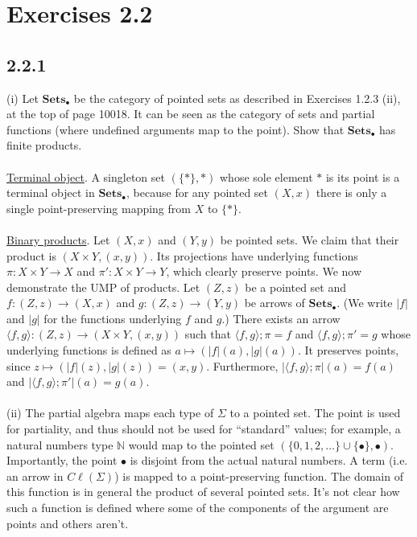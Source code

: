 \documentclass{article}
\newcommand{\mbf}{\mathbf}
\begin{document}
\section*{Exercises 2.2}

\subsection*{2.2.1}

(i) Let $\mbf{Sets}_{\bullet}$ be the category of pointed sets as described in Exercises 1.2.3 (ii), 
at the top of page 10018. 
It can be seen as the category of sets and partial functions (where undefined arguments map to the point). 
Show that $\mbf{Sets}_{\bullet}$ has finite products.\\~\\
\underline{Terminal object}. A singleton set $(\{ \ast \},\ast)$ whose sole element $\ast$ is its point
is a terminal object in $\mbf{Sets}_{\bullet}$, because for any pointed set $(X,x)$ there is only
a single point-preserving mapping from $X$ to $\{ \ast \}$.\\~\\
\underline{Binary products}. Let $(X,x)$ and $(Y,y)$ be pointed sets. We claim that their product
is $(X \times Y, (x,y))$. Its projections have underlying functions $\pi : X \times Y \to X$ 
and $\pi' : X \times Y \to Y$, which clearly preserve points. We now demonstrate the UMP of products.
Let $(Z,z)$ be a pointed set and $f : (Z,z) \to (X,x)$ and $g : (Z,z) \to (Y,y)$ be arrows of $\mbf{Sets}_{\bullet}$.
(We write $|f|$ and $|g|$ for the functions underlying $f$ and $g$.) There exists an arrow 
$\langle f, g \rangle : (Z,z) \to (X \times Y, (x,y))$ such that $\langle f, g \rangle;\pi = f$ and 
$\langle f,g \rangle;\pi' = g$ whose underlying functions is defined as $a \mapsto (|f|(a), |g|(a))$.
It preserves points, since $z \mapsto (|f|(z), |g|(z)) = (x,y)$. Furthermore, $|\langle f, g \rangle;\pi|(a) = 
f(a)$ and $|\langle f,g \rangle;\pi'|(a) = g(a)$.\\~\\
(ii) The partial algebra maps each type of $\Sigma$ to a pointed set. The point is used for partiality, 
and thus should not be used for ``standard'' values; for example, a natural numbers type $\mathbb N$
would map to the pointed set $(\{ 0,1,2,\ldots \} \cup \{ \bullet \}, \bullet)$. Importantly, 
the point $\bullet$ is disjoint from the actual natural numbers. A term (i.e. an arrow in $C \ell(\Sigma)$)
is mapped to a point-preserving function. The domain of this function is in general
the product of several pointed sets. It's not clear how such a function is defined where some of the components
of the argument are points and others aren't.
\end{document}
